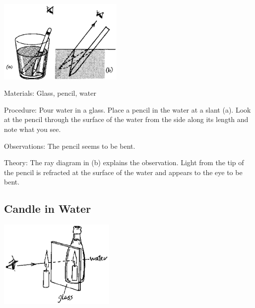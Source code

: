 \begin{multicols}{2}
\begin{center}
\includegraphics[width=0.45\textwidth]{./img/source/bending-pencil.png}
\end{center}

\begin{description*}
\item[Materials:]{Glass, pencil, water}
\item[Procedure:]{Pour water in a glass. Place a pencil in the water at a slant (a). Look at the pencil through the surface of the water from the side along its length and note what you see.}
\item[Observations:]{The pencil seems to be bent.}
\item[Theory:]{The ray diagram in (b) explains the observation. Light from the tip of the pencil is refracted at the surface of the water and appears to the eye to be bent.}
\end{description*}

\subsection{Candle in Water}

\begin{center}
\includegraphics[width=0.42\textwidth]{./img/source/candle-in-water.png}
\end{center}


\end{multicols}
